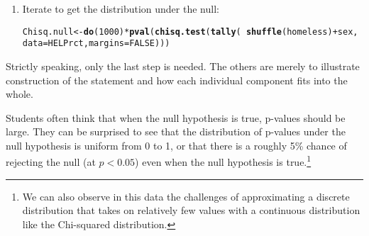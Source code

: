 \documentclass[11pt]{article}\usepackage[]{graphicx}\usepackage[]{color}
\makeatletter
\newcommand{\hlnum}[1]{\textcolor[rgb]{0.686,0.059,0.569}{#1}}%
\newcommand{\hlopt}[1]{\textcolor[rgb]{0,0,0}{#1}}%
\newcommand{\hlstd}[1]{\textcolor[rgb]{0.345,0.345,0.345}{#1}}%
\newcommand{\hlkwb}[1]{\textcolor[rgb]{0.69,0.353,0.396}{#1}}%
\newcommand{\hlkwc}[1]{\textcolor[rgb]{0.333,0.667,0.333}{#1}}%
\newcommand{\hlkwd}[1]{\textcolor[rgb]{0.737,0.353,0.396}{\textbf{#1}}}%
\newenvironment{kframe}{%
 \def\at@end@of@kframe{}%
 \ifinner\ifhmode%
  \def\at@end@of@kframe{\end{minipage}}%
  \begin{minipage}{\columnwidth}%
 \fi\fi%
 \def\FrameCommand##1{\hskip\@totalleftmargin \hskip-\fboxsep
 \colorbox{shadecolor}{##1}\hskip-\fboxsep
     \hskip-\linewidth \hskip-\@totalleftmargin \hskip\columnwidth}%
 \MakeFramed {\advance\hsize-\width
   \@totalleftmargin\z@ \linewidth\hsize
   \@setminipage}}%
 {\par\unskip\endMakeFramed%
 \at@end@of@kframe}
\newenvironment{knitrout}{}{} %
\makeatother
\begin{document}
\begin{enumerate}
\item Iterate to get the distribution under the null:
\begin{knitrout}
\color{fgcolor}\begin{kframe}
\begin{alltt}
\hlstd{Chisq.null} \hlkwb{<-} \hlkwd{do}\hlstd{(}\hlnum{1000}\hlstd{)}\hlopt{*} \hlkwd{pval}\hlstd{(}\hlkwd{chisq.test}\hlstd{(}\hlkwd{tally}\hlstd{(}\hlopt{~} \hlkwd{shuffle}\hlstd{(homeless)} \hlopt{+} \hlstd{sex,}
                         \hlkwc{data} \hlstd{= HELPrct,} \hlkwc{margins} \hlstd{=} \hlnum{FALSE}\hlstd{)))}
\end{alltt}
\end{kframe}
\end{knitrout}
\end{enumerate}
Strictly speaking, only the last step is needed.  The others are merely to 
illustrate construction of the statement and how each individual component
fits into the whole.

Students often think that when the null hypothesis is true, p-values should be large.
They can be surprised to see that the distribution of p-values under the null hypothesis is uniform from 0 to 1, or that there is a roughly 5\% chance of rejecting the null (at $p < 0.05$) even when the null hypothesis is true.\footnote{
We can also observe in this data the challenges of approximating a discrete 
distribution that takes on relatively few values with a continuous distribution
like the Chi-squared distribution.}
\end{document}
